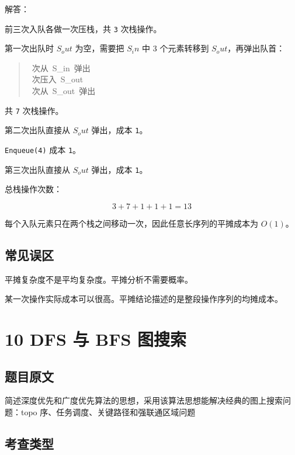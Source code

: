 \documentclass[UTF8,zihao=-4]{ctexart}
\begin{document}
解答：

前三次入队各做一次压栈，共 \texttt{3} 次栈操作。

第一次出队时 $S_out$ 为空，需要把 $S_in$ 中 3 个元素转移到 $S_out$，再弹出队首：

\begin{quote}
\small\ttfamily\raggedright
{}\ 次从\ S\_in\ 弹出\\
\ 次压入\ S\_out\\
\ 次从\ S\_out\ 弹出\\
\end{quote}

共 \texttt{7} 次栈操作。

第二次出队直接从 $S_out$ 弹出，成本 \texttt{1}。

\texttt{Enqueue(4)} 成本 \texttt{1}。

第三次出队直接从 $S_out$ 弹出，成本 \texttt{1}。

总栈操作次数：

\[3 + 7 + 1 + 1 + 1 = 13\]

每个入队元素只在两个栈之间移动一次，因此任意长序列的平摊成本为 $O(1)$。

\subsection*{常见误区}

平摊复杂度不是平均复杂度。平摊分析不需要概率。

某一次操作实际成本可以很高。平摊结论描述的是整段操作序列的均摊成本。

\newpage

\section*{10 DFS 与 BFS 图搜索}

\subsection*{题目原文}

简述深度优先和广度优先算法的思想，采用该算法思想能解决经典的图上搜索问题：topo 序、任务调度、关键路径和强联通区域问题

\subsection*{考查类型}
\end{document}
